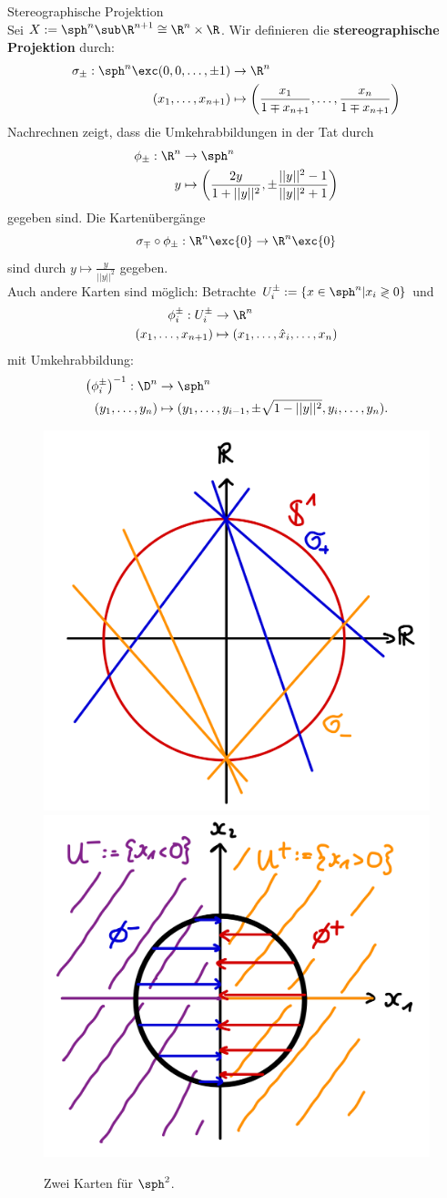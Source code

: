 \begin{beispiel}{Stereographische Projektion} \\
Sei $X := \sph^n \sub \R^{n+1} \cong \R^n \times \R$. Wir definieren die \textbf{stereographische Projektion} durch:
\begin{align}
\sigma_\pm : \sph^n \exc (0, 0, \dots, \pm 1) & \to \R^n \\
(x_1, \dots, x_{n+1}) & \mapsto \left( \frac{x_1}{1 \mp x_{n+1}}, \dots , \frac{x_n}{1 \mp x_{n+1}} \right)
\end{align} 
Nachrechnen zeigt, dass die Umkehrabbildungen in der Tat durch
\begin{align}
\phi_\pm : \R^n &\to \sph^n \\
y &\mapsto \left( \frac{2y}{1+||y||^2}, \pm \frac{||y||^2 - 1}{||y||^2 + 1}\right)
\end{align}
gegeben sind. Die Kartenübergänge
\begin{equation}
\sigma_\mp \circ \phi_\pm: \R^n \exc \{0\} \to \R^n \exc \{0\} 
\end{equation}
sind durch $y \mapsto \frac{y}{||y||^2}$ gegeben.\\
Auch andere Karten sind möglich:
Betrachte $U_i^\pm := \{ x \in \sph^n | x_i \gtrless 0 \}$ und 
\begin{align}
\phi_i^\pm: U_i^\pm &\to \R^n \\
(x_1, \dots, x_{n+1}) &\mapsto (x_1, \dots, \hat{x}_i, \dots, x_n)
\end{align}
mit Umkehrabbildung:
\begin{align}
\left( \phi_i^\pm \right)^{-1}: \D^n &\to \sph^n \\
(y_1, \dots, y_{n}) &\mapsto (y_1, \dots, y_{i-1}, \pm \sqrt{1-||y||^2}, y_i, \dots, y_n).
\end{align}
\begin{figure}[H]
\label{fig:sphere}
\centering
\includegraphics[width=0.2\linewidth]{Bilder/stereograph.png}
\includegraphics[width=0.2\linewidth]{Bilder/sphereproj.png}
\caption{Zwei Karten für $\sph^2$.}
\end{figure}
\end{beispiel}
